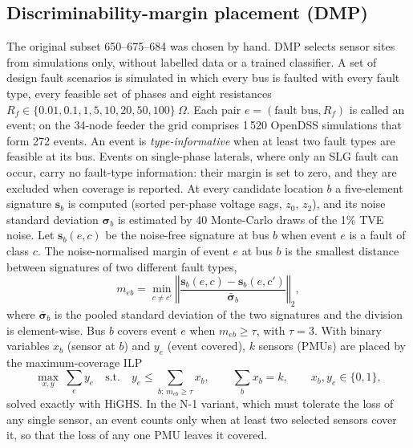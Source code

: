 \documentclass[11pt]{article}
\newenvironment{nw}{}{}
\newcommand{\hlnew}[1]{#1}
\begin{document}
\begin{nw}
\subsection{Discriminability-margin placement (DMP)}\label{subsec3_4}

The original subset 650--675--684 was chosen by hand. DMP selects sensor sites from simulations only, without labelled data or a trained classifier. A set of design fault scenarios is simulated in which every bus is faulted with every fault type, every feasible set of phases and eight resistances $R_f\in\{0.01,0.1,1,5,10,20,50,100\}~\Omega$. Each pair $e=(\text{fault bus},R_f)$ is called an event; on the 34-node feeder the grid comprises 1\,520 OpenDSS simulations that form 272 events. \hlnew{An event is \emph{type-informative} when at least two fault types are feasible at its bus. Events on single-phase laterals, where only an SLG fault can occur, carry no fault-type information: their margin is set to zero, and they are excluded when coverage is reported.} At every candidate location $b$ a five-element signature $\mathbf{s}_b$ is computed (sorted per-phase voltage sags, $z_0$, $z_2$), and its noise standard deviation $\boldsymbol{\sigma}_b$ is estimated by 40 Monte-Carlo draws of the 1\% TVE noise. Let $\mathbf{s}_b(e,c)$ be the noise-free signature at bus $b$ when event $e$ is a fault of class $c$. The noise-normalised margin of event $e$ at bus $b$ is the smallest distance between signatures of two different fault types,
\begin{equation}\label{eq8}
m_{eb}=\min_{c\neq c'}\left\Vert \frac{\mathbf{s}_b(e,c)-\mathbf{s}_b(e,c')}{\bar{\boldsymbol{\sigma}}_b}\right\Vert_2 ,
\end{equation}
where $\bar{\boldsymbol{\sigma}}_b$ is the pooled standard deviation of the two signatures and the division is element-wise. Bus $b$ covers event $e$ when $m_{eb}\ge\tau$, with $\tau=3$. With binary variables $x_b$ (sensor at $b$) and $y_e$ (event covered), $k$ sensors (PMUs) are placed by the maximum-coverage ILP
\begin{equation}\label{eq9}
\max_{x,y}\ \sum_e y_e \quad\text{s.t.}\quad y_e\le\sum_{b:\,m_{eb}\ge\tau}x_b,\qquad \sum_b x_b=k,\qquad x_b,y_e\in\{0,1\},
\end{equation}
solved exactly with HiGHS. In the N-1 variant, which must tolerate the loss of any single sensor, an event counts only when at least two selected sensors cover it, so that the loss of any one PMU leaves it covered.


\end{nw}
\end{document}
